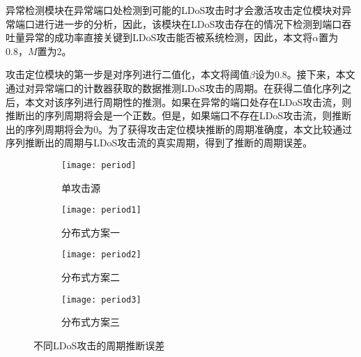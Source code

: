 异常检测模块在异常端口处检测到可能的LDoS攻击时才会激活攻击定位模块对异常端口进行进一步的分析，因此，该模块在LDoS攻击存在的情况下检测到端口吞吐量异常的成功率直接关键到LDoS攻击能否被系统检测，因此，本文将$\alpha$置为0.8，$M$置为2。








攻击定位模块的第一步是对序列进行二值化，本文将阈值$\beta$设为0.8。接下来，本文通过对异常端口的计数器获取的数据推测LDoS攻击的周期。在获得二值化序列之后，本文对该序列进行周期性的推测。如果在异常的端口处存在LDoS攻击流，则推断出的序列周期将会是一个正数。但是，如果端口不存在LDoS攻击流，则推断出的序列周期将会为0。为了获得攻击定位模块推断的周期准确度，本文比较通过序列推断出的周期与LDoS攻击流的真实周期，得到了推断的周期误差。

\begin{figure}
    \begin{subfigure}{.49\textwidth}
        \centering
        \texttt{[image: period]}
        \caption{单攻击源}
        \label{fig:period-single}
    \end{subfigure}
    \begin{subfigure}{.49\textwidth}
        \centering
        \texttt{[image: period1]}
        \caption{分布式方案一}
        \label{fig:period-2h-mod1}
    \end{subfigure}

    \begin{subfigure}{.49\textwidth}
        \centering
        \texttt{[image: period2]}
        \caption{分布式方案二}
        \label{fig:period-2h-mod2}
    \end{subfigure}
    \begin{subfigure}{.49\textwidth}
        \centering
        \texttt{[image: period3]}
        \caption{分布式方案三}
        \label{fig:period-2h-mod3}
    \end{subfigure}


    \caption{不同LDoS攻击的周期推断误差}
    \label{fig:period-all}
\end{figure}


